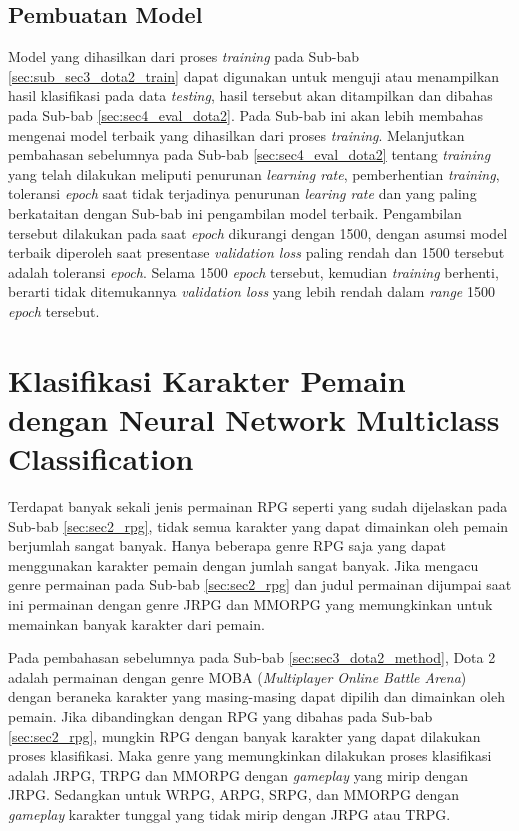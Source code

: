 \subsection{Pembuatan Model}
\label{sec:sub_sec3_dota2_model}
\vspace{1ex}

Model yang dihasilkan dari proses \textit{training} pada Sub-bab \ref{sec:sub_sec3_dota2_train} dapat digunakan untuk menguji atau menampilkan hasil klasifikasi pada data \textit{testing}, hasil tersebut akan ditampilkan dan dibahas pada Sub-bab \ref{sec:sec4_eval_dota2}. Pada Sub-bab ini akan lebih membahas mengenai model terbaik yang dihasilkan dari proses \textit{training}. Melanjutkan pembahasan sebelumnya pada Sub-bab \ref{sec:sec4_eval_dota2} tentang \textit{training} yang telah dilakukan meliputi penurunan \textit{learning rate}, pemberhentian \textit{training}, toleransi \textit{epoch} saat tidak terjadinya penurunan \textit{learing rate} dan yang paling berkataitan dengan Sub-bab ini pengambilan model terbaik. Pengambilan tersebut dilakukan pada saat \textit{epoch} dikurangi dengan 1500, dengan asumsi model terbaik diperoleh saat presentase \textit{validation loss} paling rendah dan 1500 tersebut adalah toleransi \textit{epoch}. Selama 1500 \textit{epoch} tersebut, kemudian \textit{training} berhenti, berarti tidak ditemukannya \textit{validation loss} yang lebih rendah dalam \textit{range} 1500 \textit{epoch} tersebut.
\vspace{1ex}

\section{Klasifikasi Karakter Pemain dengan Neural Network Multiclass Classification}
\label{sec:sec3_player_method}
\vspace{1ex}

Terdapat banyak sekali jenis permainan RPG seperti yang sudah dijelaskan pada Sub-bab \ref{sec:sec2_rpg}, tidak semua karakter yang dapat dimainkan oleh pemain berjumlah sangat banyak. Hanya beberapa genre RPG saja yang dapat menggunakan karakter pemain dengan jumlah sangat banyak. Jika mengacu genre permainan pada Sub-bab \ref{sec:sec2_rpg} dan judul permainan dijumpai saat ini permainan dengan genre JRPG dan MMORPG yang memungkinkan untuk memainkan banyak karakter dari pemain.
\vspace{1ex}

Pada pembahasan sebelumnya pada Sub-bab \ref{sec:sec3_dota2_method}, Dota 2 adalah permainan dengan genre MOBA (\textit{Multiplayer Online Battle Arena}) dengan beraneka karakter yang masing-masing dapat dipilih dan dimainkan oleh pemain. Jika dibandingkan dengan RPG yang dibahas pada Sub-bab \ref{sec:sec2_rpg}, mungkin RPG dengan banyak karakter yang dapat dilakukan proses klasifikasi. Maka genre yang memungkinkan dilakukan proses klasifikasi adalah JRPG, TRPG dan MMORPG dengan \textit{gameplay} yang mirip dengan JRPG. Sedangkan untuk WRPG, ARPG, SRPG, dan MMORPG dengan \textit{gameplay} karakter tunggal yang tidak mirip dengan JRPG atau TRPG.
\vspace{1ex}

